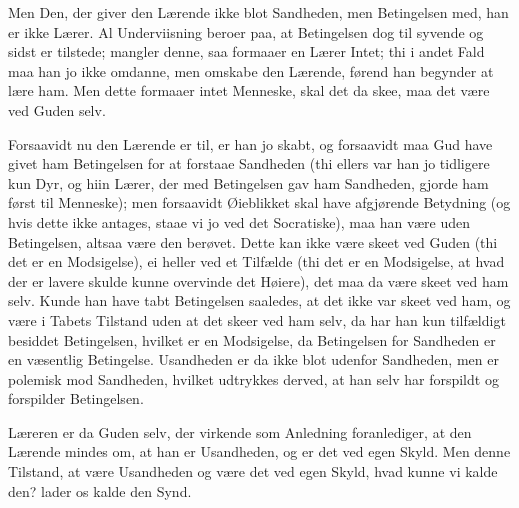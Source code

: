 \documentclass[12pt,a4paper]{article}
\begin{document}
Men Den, der giver den Lærende ikke blot Sandheden, men Betingelsen med, han er ikke Lærer. Al Underviisning beroer paa, at Betingelsen dog til syvende og sidst er tilstede; mangler denne, saa formaaer en Lærer Intet; thi i andet Fald maa han jo ikke omdanne, men omskabe den Lærende, førend han begynder at lære ham. Men dette formaaer intet Menneske, skal det da skee, maa det være ved Guden selv.

Forsaavidt nu den Lærende er til, er han jo skabt, og forsaavidt maa Gud have givet ham Betingelsen for at forstaae Sandheden (thi ellers var han jo tidligere kun Dyr, og hiin Lærer, der med Betingelsen gav ham Sandheden, gjorde ham først til Menneske); men forsaavidt Øieblikket skal have afgjørende Betydning (og hvis dette ikke antages, staae vi jo ved det Socratiske), maa han være uden Betingelsen, altsaa være den berøvet. Dette kan ikke være skeet ved Guden (thi det er en Modsigelse), ei heller ved et Tilfælde (thi det er en Modsigelse, at hvad der er lavere skulde kunne overvinde det Høiere), det maa da være skeet ved ham selv. Kunde han have tabt Betingelsen saaledes, at det ikke var skeet ved ham, og være i Tabets Tilstand uden at det skeer ved ham selv, da har han kun tilfældigt besiddet Betingelsen, hvilket er en Modsigelse, da Betingelsen for Sandheden er en væsentlig Betingelse. Usandheden er da ikke blot udenfor Sandheden, men er polemisk mod Sandheden, hvilket udtrykkes derved, at han selv har forspildt og forspilder Betingelsen.

Læreren er da Guden selv, der virkende som Anledning foranlediger, at den Lærende mindes om, at han er Usandheden, og er det ved egen Skyld. Men denne Tilstand, at være Usandheden og være det ved egen Skyld, hvad kunne vi kalde den? lader os kalde den Synd.
\end{document}
